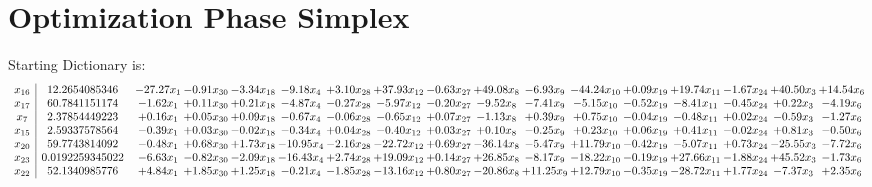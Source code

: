 \documentclass[9pt]{article}
\begin{document}
\section{Optimization Phase Simplex}
Starting Dictionary is:
\[\begin{array}{c| c c@{\hskip 2pt} c@{\hskip 2pt} c@{\hskip 2pt} c@{\hskip 2pt} c@{\hskip 2pt} c@{\hskip 2pt} c@{\hskip 2pt} c@{\hskip 2pt} c@{\hskip 2pt} c@{\hskip 2pt} c@{\hskip 2pt} c@{\hskip 2pt} c@{\hskip 2pt} c@{\hskip 2pt} c@{\hskip 2pt} }
 x_{16}   &  12.2654085346 & -27.27 x_{1} & -0.91 x_{30} & -3.34 x_{18} & -9.18 x_{4} & +  3.10 x_{28} & + 37.93 x_{12} & -0.63 x_{27} & + 49.08 x_{8} & -6.93 x_{9} & -44.24 x_{10} & +  0.09 x_{19} & + 19.74 x_{11} & -1.67 x_{24} & + 40.50 x_{3} & + 14.54 x_{6}\\
 x_{17}   &  60.7841151174 & -1.62 x_{1} & +  0.11 x_{30} & +  0.21 x_{18} & -4.87 x_{4} & -0.27 x_{28} & -5.97 x_{12} & -0.20 x_{27} & -9.52 x_{8} & -7.41 x_{9} & -5.15 x_{10} & -0.52 x_{19} & -8.41 x_{11} & -0.45 x_{24} & +  0.22 x_{3} & -4.19 x_{6}\\
 x_{7}   &  2.37854449223 & +  0.16 x_{1} & +  0.05 x_{30} & +  0.09 x_{18} & -0.67 x_{4} & -0.06 x_{28} & -0.65 x_{12} & +  0.07 x_{27} & -1.13 x_{8} & +  0.39 x_{9} & +  0.75 x_{10} & -0.04 x_{19} & -0.48 x_{11} & +  0.02 x_{24} & -0.59 x_{3} & -1.27 x_{6}\\
 x_{15}   &  2.59337578564 & -0.39 x_{1} & +  0.03 x_{30} & -0.02 x_{18} & -0.34 x_{4} & +  0.04 x_{28} & -0.40 x_{12} & +  0.03 x_{27} & +  0.10 x_{8} & -0.25 x_{9} & +  0.23 x_{10} & +  0.06 x_{19} & +  0.41 x_{11} & -0.02 x_{24} & +  0.81 x_{3} & -0.50 x_{6}\\
 x_{20}   &  59.7743814092 & -0.48 x_{1} & +  0.68 x_{30} & +  1.73 x_{18} & -10.95 x_{4} & -2.16 x_{28} & -22.72 x_{12} & +  0.69 x_{27} & -36.14 x_{8} & -5.47 x_{9} & + 11.79 x_{10} & -0.42 x_{19} & -5.07 x_{11} & +  0.73 x_{24} & -25.55 x_{3} & -7.72 x_{6}\\
 x_{23}   &  0.0192259345022 & -6.63 x_{1} & -0.82 x_{30} & -2.09 x_{18} & -16.43 x_{4} & +  2.74 x_{28} & + 19.09 x_{12} & +  0.14 x_{27} & + 26.85 x_{8} & -8.17 x_{9} & -18.22 x_{10} & -0.19 x_{19} & + 27.66 x_{11} & -1.88 x_{24} & + 45.52 x_{3} & -1.73 x_{6}\\
 x_{22}   &  52.1340985776 & +  4.84 x_{1} & +  1.85 x_{30} & +  1.25 x_{18} & -0.21 x_{4} & -1.85 x_{28} & -13.16 x_{12} & +  0.80 x_{27} & -20.86 x_{8} & + 11.25 x_{9} & + 12.79 x_{10} & -0.35 x_{19} & -28.72 x_{11} & +  1.77 x_{24} & -7.37 x_{3} & +  2.35 x_{6}\\

\end{array}\]
\end{document}
